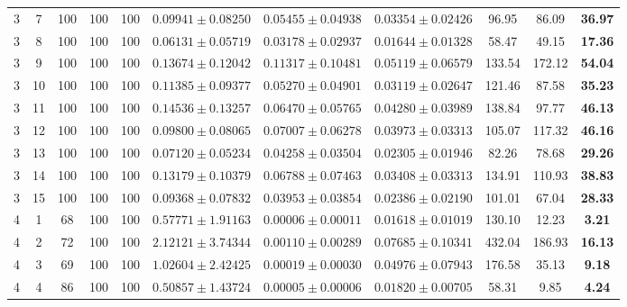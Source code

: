 \begin{table}[!ht]
{\begin{tabular}{|c|c|c|c|c|c|c|c|c|c|c|}
        3 & 7 & 100 & 100 & 100 & $0.09941 \pm 0.08250$ & $0.05455 \pm 0.04938$ & $\mathbf{0.03354} \pm \mathbf{0.02426}$ & 96.95 & 86.09 & \textbf{36.97} \\
        3 & 8 & 100 & 100 & 100 & $0.06131 \pm 0.05719$ & $0.03178 \pm 0.02937$ & $\mathbf{0.01644} \pm \mathbf{0.01328}$ & 58.47 & 49.15 & \textbf{17.36} \\
        3 & 9 & 100 & 100 & 100 & $0.13674 \pm 0.12042$ & $0.11317 \pm 0.10481$ & $\mathbf{0.05119} \pm \mathbf{0.06579}$ & 133.54 & 172.12 & \textbf{54.04} \\
        3 & 10 & 100 & 100 & 100 & $0.11385 \pm 0.09377$ & $0.05270 \pm 0.04901$ & $\mathbf{0.03119} \pm \mathbf{0.02647}$ & 121.46 & 87.58 & \textbf{35.23} \\
        3 & 11 & 100 & 100 & 100 & $0.14536 \pm 0.13257$ & $0.06470 \pm 0.05765$ & $\mathbf{0.04280} \pm \mathbf{0.03989}$ & 138.84 & 97.77 & \textbf{46.13} \\
        3 & 12 & 100 & 100 & 100 & $0.09800 \pm 0.08065$ & $0.07007 \pm 0.06278$ & $\mathbf{0.03973} \pm \mathbf{0.03313}$ & 105.07 & 117.32 & \textbf{46.16} \\
        3 & 13 & 100 & 100 & 100 & $0.07120 \pm 0.05234$ & $0.04258 \pm 0.03504$ & $\mathbf{0.02305} \pm \mathbf{0.01946}$ & 82.26 & 78.68 & \textbf{29.26} \\
        3 & 14 & 100 & 100 & 100 & $0.13179 \pm 0.10379$ & $0.06788 \pm 0.07463$ & $\mathbf{0.03408} \pm \mathbf{0.03313}$ & 134.91 & 110.93 & \textbf{38.83} \\
        3 & 15 & 100 & 100 & 100 & $0.09368 \pm 0.07832$ & $0.03953 \pm 0.03854$ & $\mathbf{0.02386} \pm \mathbf{0.02190}$ & 101.01 & 67.04 & \textbf{28.33} \\
        \hline
        4 & 1 & 68 & 100 & 100 & $0.57771 \pm 1.91163$ & $\mathbf{0.00006} \pm \mathbf{0.00011}$ & $0.01618 \pm 0.01019$ & 130.10 & 12.23 & \textbf{3.21} \\
        4 & 2 & 72 & 100 & 100 & $2.12121 \pm 3.74344$ & $\mathbf{0.00110} \pm \mathbf{0.00289}$ & $0.07685 \pm 0.10341$ & 432.04 & 186.93 & \textbf{16.13} \\
        4 & 3 & 69 & 100 & 100 & $1.02604 \pm 2.42425$ & $\mathbf{0.00019} \pm \mathbf{0.00030}$ & $0.04976 \pm 0.07943$ & 176.58 & 35.13 & \textbf{9.18} \\
        4 & 4 & 86 & 100 & 100 & $0.50857 \pm 1.43724$ & $\mathbf{0.00005} \pm \mathbf{0.00006}$ & $0.01820 \pm 0.00705$ & 58.31 & 9.85 & \textbf{4.24} \\

\end{tabular}}
\end{table}
